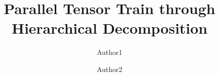 \documentclass[sigconf]{acmart}
\begin{document}
\title{Parallel Tensor Train through Hierarchical Decomposition}



\author{Author1}

\author{Author2}


\renewcommand{\shortauthors}{Author1 and Author2.}
\end{document}
